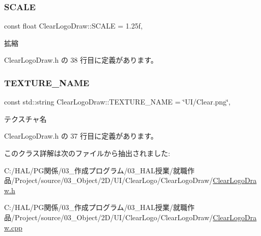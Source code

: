 \mbox{\label{class_clear_logo_draw_afdf263982add6dd6b8ac167b3ef44dc0}} 
\subsubsection{\texorpdfstring{S\+C\+A\+LE}{SCALE}}
{\footnotesize\ttfamily const float Clear\+Logo\+Draw\+::\+S\+C\+A\+LE = 1.\+25f\hspace{0.3cm}{\ttfamily [static]}, {\ttfamily [private]}}



拡縮 



 Clear\+Logo\+Draw.\+h の 38 行目に定義があります。

\mbox{\label{class_clear_logo_draw_aea89948b2e9b540fe35f1c910824c82f}} 
\subsubsection{\texorpdfstring{T\+E\+X\+T\+U\+R\+E\+\_\+\+N\+A\+ME}{TEXTURE\_NAME}}
{\footnotesize\ttfamily const std\+::string Clear\+Logo\+Draw\+::\+T\+E\+X\+T\+U\+R\+E\+\_\+\+N\+A\+ME = \char`\"{}UI/Clear.\+png\char`\"{}\hspace{0.3cm}{\ttfamily [static]}, {\ttfamily [private]}}



テクスチャ名 



 Clear\+Logo\+Draw.\+h の 37 行目に定義があります。



このクラス詳解は次のファイルから抽出されました\+:\begin{DoxyCompactItemize}
\item 
C\+:/\+H\+A\+L/\+P\+G関係/03\+\_\+作成プログラム/03\+\_\+\+H\+A\+L授業/就職作品/\+Project/source/03\+\_\+\+Object/2\+D/\+U\+I/\+Clear\+Logo/\+Clear\+Logo\+Draw/\mbox{\hyperlink{_clear_logo_draw_8h}{Clear\+Logo\+Draw.\+h}}\item 
C\+:/\+H\+A\+L/\+P\+G関係/03\+\_\+作成プログラム/03\+\_\+\+H\+A\+L授業/就職作品/\+Project/source/03\+\_\+\+Object/2\+D/\+U\+I/\+Clear\+Logo/\+Clear\+Logo\+Draw/\mbox{\hyperlink{_clear_logo_draw_8cpp}{Clear\+Logo\+Draw.\+cpp}}\end{DoxyCompactItemize}
